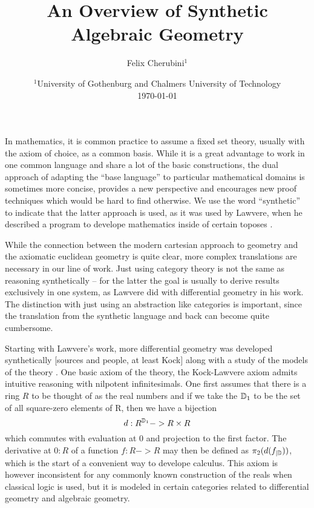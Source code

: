 \documentclass{../util/zariski}
\title{An Overview of Synthetic Algebraic Geometry}
\begin{document}
\author{Felix Cherubini$^1$}
\date{
  $^1$University of Gothenburg and Chalmers University of Technology \\[2ex]%
  \today
}

\maketitle



In mathematics, it is common practice to assume a fixed set theory, usually with the axiom of choice, as a common basis. While it is a great advantage to work in one common language and share a lot of the basic constructions, the dual approach of adapting the  ``base language'' to particular mathematical domains is sometimes more concise, provides a new perspective and encourages new proof techniques which would be hard to find otherwise.
We use the word ``synthetic'' to indicate that the latter approach is used,
as it was used by Lawvere, when he described a program to develope mathematics inside of certain toposes \cite{lawvere-categorical-dynamics}.

While the connection between the modern cartesian approach to geometry and the axiomatic euclidean geometry is quite clear,
more complex translations are necessary in our line of work.
Just using category theory is not the same as reasoning synthetically -- for the latter the goal is usually to derive results exclusively in one system,
as Lawvere did with differential geometry in his work.
The distinction with just using an abstraction like categories is important, since the translation from the synthetic language and back can become quite cumbersome.

Starting with Lawvere's work, more differential geometry was developed synthetically [sources and people, at least Kock] along with a study of the models of the theory \cite{moerdijk-reyes}.
One basic axiom of the theory, the Kock-Lawvere axiom admits intuitive reasoning with nilpotent infinitesimals.
One first assumes that there is a ring $R$ to be thought of as the real numbers and if we take the $\mathbb{D}_1$ to be the set of all square-zero elements of R, then we have a bijection
\[ d : R^{\mathbb{D}_1} -> R \times R \]
which commutes with evaluation at 0 and projection to the first factor.
The derivative at $0:R$ of a function $f : R -> R$ may then be defined as $\pi_2(d(f_{\vert \mathbb{D}}))$, which is the start of a convenient way to develope calculus.
This axiom is however inconsistent for any commonly known construction of the reals when classical logic is used, but it is modeled in certain categories related to differential geometry and algebraic geometry.
\end{document}

